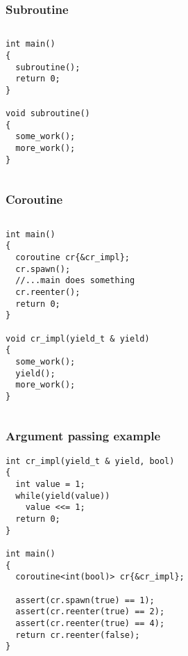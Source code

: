 \documentclass{beamer}
\begin{document}
\begin{frame}[fragile]
\frametitle{Subroutine}
\begin{columns}
\begin{column}{0.5\textwidth}
\begin{block}{}
\begin{lstlisting}
int main()
{
  subroutine();
  return 0;
}

void subroutine()
{
  some_work();
  more_work();
}
\end{lstlisting}
\end{block}
\end{column}
\begin{column}{0.5\textwidth}
\begin{adjustbox}{max totalsize={.9\textwidth}{.7\textheight},center}

\end{adjustbox}
\end{column}
\end{columns}
\end{frame}


\begin{frame}[fragile]
\frametitle{Coroutine}
\begin{columns}
\begin{column}{0.7\textwidth}
\begin{block}{}
\begin{lstlisting}
int main()
{
  coroutine cr{&cr_impl};
  cr.spawn();
  //...main does something
  cr.reenter();
  return 0;
}

void cr_impl(yield_t & yield)
{
  some_work();
  yield();
  more_work();
}
\end{lstlisting}
\end{block}
\end{column}
\begin{column}{0.3\textwidth}
\begin{adjustbox}{max totalsize={.9\textwidth}{.7\textheight},center}

\end{adjustbox}
\end{column}
\end{columns}
\end{frame}

\begin{frame}[fragile]
\frametitle{Argument passing example}
\begin{block}{}
\begin{lstlisting}[basicstyle=\small]
int cr_impl(yield_t & yield, bool) 
{
  int value = 1;
  while(yield(value))
    value <<= 1;
  return 0;
}

int main() 
{
  coroutine<int(bool)> cr{&cr_impl};
  
  assert(cr.spawn(true) == 1);
  assert(cr.reenter(true) == 2);
  assert(cr.reenter(true) == 4);
  return cr.reenter(false);
}
\end{lstlisting}
\end{block}
\end{frame}
\end{document}
